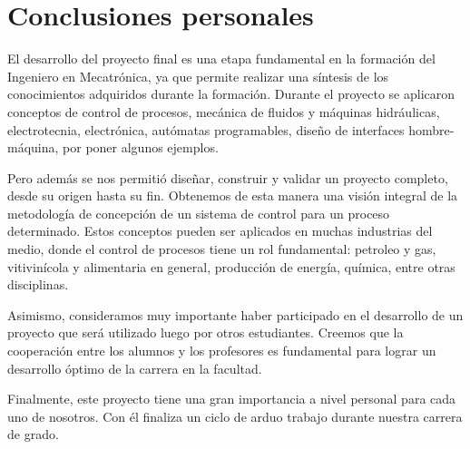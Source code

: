 \section{Conclusiones personales}
\label{sec:ConclusionPersonal}


El desarrollo del proyecto final es una etapa fundamental en la formación del
Ingeniero en Mecatrónica, ya que permite realizar una síntesis de los
conocimientos adquiridos durante la formación.
Durante el proyecto se aplicaron conceptos de control de
procesos, mecánica de fluidos y máquinas hidráulicas, electrotecnia,
electrónica, autómatas programables, diseño de interfaces hombre-máquina, por 
poner algunos ejemplos.

Pero además se nos permitió diseñar, construir y validar un proyecto completo,
desde su origen hasta su fin.
Obtenemos de esta manera una visión integral de la metodología de concepción de
un
sistema de control para un proceso determinado.
Estos conceptos pueden ser aplicados en muchas industrias del medio, donde el
control de procesos tiene un rol fundamental: petroleo y gas, vitivinícola y
alimentaria en general, producción de energía, química, entre otras disciplinas.

Asimismo, consideramos muy importante haber participado en el desarrollo de un
proyecto que será utilizado luego por otros estudiantes.
Creemos que la cooperación entre los alumnos y los profesores es fundamental
para lograr un desarrollo óptimo de la carrera en la facultad.

Finalmente, este proyecto tiene una gran importancia a nivel personal para cada
uno de nosotros.
Con él finaliza un ciclo de arduo trabajo durante nuestra
carrera de grado.

